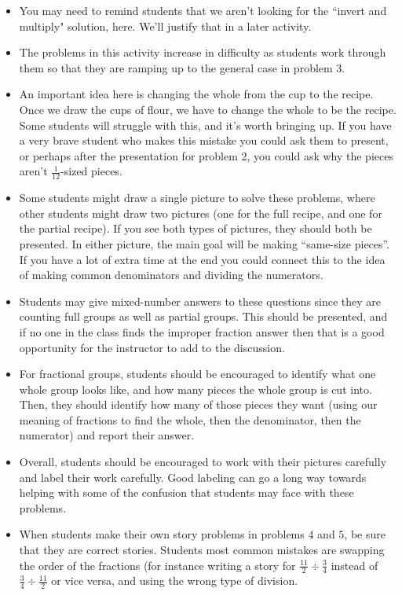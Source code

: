\documentclass[nooutcomes,noauthor]{ximera}
\begin{document}
\begin{instructorNotes}
\begin{itemize}
	\item You may need to remind students that we aren't looking for the ``invert and multiply" solution, here. We'll justify that in a later activity.
	\item The problems in this activity increase in difficulty as students work through them so that they are ramping up to the general case in problem 3.
	\item An important idea here is changing the whole from the cup to the recipe. Once we draw the cups of flour, we have to change the whole to be the recipe. Some students will struggle with this, and it's worth bringing up. If you have a very brave student who makes this mistake you could ask them to present, or perhaps after the presentation for problem 2, you could ask why the pieces aren't $\frac{1}{12}$-sized pieces. 
	\item Some students might draw a single picture to solve these problems, where other students might draw two pictures (one for the full recipe, and one for the partial recipe). If you see both types of pictures, they should both be presented. In either picture, the main goal will be making ``same-size pieces''. If you have a lot of extra time at the end you could connect this to the idea of making common denominators and dividing the numerators.
	\item Students may give mixed-number answers to these questions since they are counting full groups as well as partial groups. This should be presented, and if no one in the class finds the improper fraction answer then that is a good opportunity for the instructor to add to the discussion.
	\item For fractional groups, students should be encouraged to identify what one whole group looks like, and how many pieces the whole group is cut into. Then, they should identify how many of those pieces they want (using our meaning of fractions to find the whole, then the denominator, then the numerator) and report their answer. 
	\item Overall, students should be encouraged to work with their pictures carefully and label their work carefully. Good labeling can go a long way towards helping with some of the confusion that students may face with these problems.
	\item When students make their own story problems in problems $4$ and $5$, be sure that they are correct stories. Students most common mistakes are swapping the order of the fractions (for instance writing a story for $\frac{11}{2} \div \frac{3}{4}$ instead of $\frac{3}{4} \div \frac{11}{2}$ or vice versa, and using the wrong type of division.
\end{itemize}



\end{instructorNotes}
\end{document}
